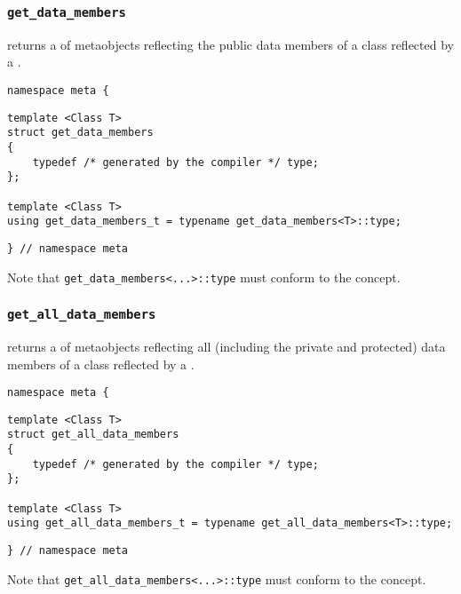 

\subsubsection{\texttt{get\_data\_members}}

returns a  of metaobjects reflecting   the public data members of a class reflected by a .

\begin{verbatim}
namespace meta {
\end{verbatim}
\begin{verbatim}
template <Class T>
struct get_data_members
{
	typedef /* generated by the compiler */ type;
};
	
template <Class T>
using get_data_members_t = typename get_data_members<T>::type;

\end{verbatim}
\begin{verbatim}
} // namespace meta
\end{verbatim}


Note that \texttt{get\_data\_members<...>::type}
must conform to the  concept.


\subsubsection{\texttt{get\_all\_data\_members}}

returns a  of metaobjects reflecting all    (including the private and protected)   data members of a class reflected by a .

\begin{verbatim}
namespace meta {
\end{verbatim}
\begin{verbatim}
template <Class T>
struct get_all_data_members
{
	typedef /* generated by the compiler */ type;
};
	
template <Class T>
using get_all_data_members_t = typename get_all_data_members<T>::type;

\end{verbatim}
\begin{verbatim}
} // namespace meta
\end{verbatim}


Note that \texttt{get\_all\_data\_members<...>::type}
must conform to the  concept.
